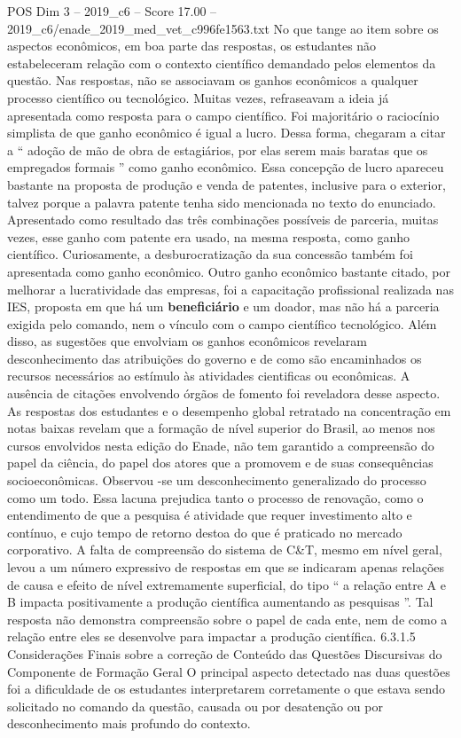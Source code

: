 \begin{textsample}{POS Dim 3 – 2019\_c6 – Score 17.00 – 2019\_c6/enade\_2019\_med\_vet\_c996fe1563.txt}
No que tange ao item sobre os aspectos econômicos, em boa parte das respostas, os estudantes não estabeleceram relação com o contexto científico demandado pelos elementos da questão.
Nas respostas, não se associavam os ganhos econômicos a qualquer processo científico ou tecnológico.
Muitas vezes, refraseavam a ideia já apresentada como resposta para o campo científico.
Foi majoritário o raciocínio simplista de que ganho econômico é igual a lucro.
Dessa forma, chegaram a citar a “ adoção de mão de obra de estagiários, por elas serem mais baratas que os empregados formais ” como ganho econômico.
Essa concepção de lucro apareceu bastante na proposta de produção e venda de patentes, inclusive para o exterior, talvez porque a palavra patente tenha sido mencionada no texto do enunciado.
Apresentado como resultado das três combinações possíveis de parceria, muitas vezes, esse ganho com patente era usado, na mesma resposta, como ganho científico.
Curiosamente, a desburocratização da sua concessão também foi apresentada como ganho econômico.
Outro ganho econômico bastante citado, por melhorar a lucratividade das empresas, foi a capacitação profissional realizada nas IES, proposta em que há um \textbf{beneficiário} e um doador, mas não há a parceria exigida pelo comando, nem o vínculo com o campo científico tecnológico.
Além disso, as sugestões que envolviam os ganhos econômicos revelaram desconhecimento das atribuições do governo e de como são encaminhados os recursos necessários ao estímulo às atividades cientificas ou econômicas.
A ausência de citações envolvendo órgãos de fomento foi reveladora desse aspecto.
As respostas dos estudantes e o desempenho global retratado na concentração em notas baixas revelam que a formação de nível superior do Brasil, ao menos nos cursos envolvidos nesta edição do Enade, não tem garantido a compreensão do papel da ciência, do papel dos atores que a promovem e de suas consequências socioeconômicas.
Observou -se um desconhecimento generalizado do processo como um todo.
Essa lacuna prejudica tanto o processo de renovação, como o entendimento de que a pesquisa é atividade que requer investimento alto e contínuo, e cujo tempo de retorno destoa do que é praticado no mercado corporativo.
A falta de compreensão do sistema de C\&T, mesmo em nível geral, levou a um número expressivo de respostas em que se indicaram apenas relações de causa e efeito de nível extremamente superficial, do tipo “ a relação entre A e B impacta positivamente a produção científica aumentando as pesquisas ”.
Tal resposta não demonstra compreensão sobre o papel de cada ente, nem de como a relação entre eles se desenvolve para impactar a produção científica. 6.3.1.5 Considerações Finais sobre a correção de Conteúdo das Questões Discursivas do Componente de Formação Geral O principal aspecto detectado nas duas questões foi a dificuldade de os estudantes interpretarem corretamente o que estava sendo solicitado no comando da questão, causada ou por desatenção ou por desconhecimento mais profundo do contexto.

\end{textsample}
